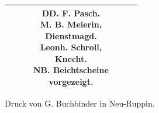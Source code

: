 \begin{quertabelle}
\begin{center}
\begin{tabular}{|r|c|c|c|c|c|c|}
 & & & \zl{DD. F. Pasch.\\ M. B. Meierin,\\ Dienstmagd.\\ Leonh. Schroll,\\ Knecht.\\ NB. Beichtscheine\\ vorgezeigt.} & & & \\ \hline
\end{tabular}
\end{center}
\end{quertabelle}

\begin{unterschrift}
Druck von G. Buchbinder in Neu-Ruppin.
\end{unterschrift}




